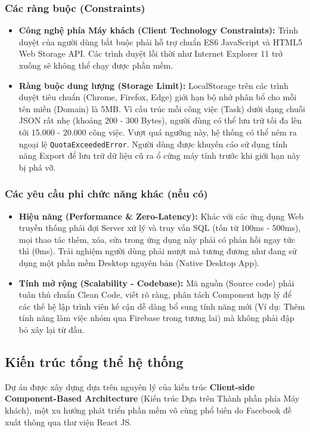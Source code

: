 \subsubsection{Các ràng buộc (Constraints)}
\begin{itemize}
    \item \textbf{Công nghệ phía Máy khách (Client Technology Constraints):} Trình duyệt của người dùng bắt buộc phải hỗ trợ chuẩn ES6 JavaScript và HTML5 Web Storage API. Các trình duyệt lỗi thời như Internet Explorer 11 trở xuống sẽ không thể chạy được phần mềm.
    \item \textbf{Ràng buộc dung lượng (Storage Limit):} LocalStorage trên các trình duyệt tiêu chuẩn (Chrome, Firefox, Edge) giới hạn bộ nhớ phân bổ cho mỗi tên miền (Domain) là 5MB. Vì cấu trúc mỗi công việc (Task) dưới dạng chuỗi JSON rất nhẹ (khoảng 200 - 300 Bytes), người dùng có thể lưu trữ tối đa lên tới 15.000 - 20.000 công việc. Vượt quá ngưỡng này, hệ thống có thể ném ra ngoại lệ \texttt{QuotaExceededError}. Người dùng được khuyến cáo sử dụng tính năng Export để lưu trữ dữ liệu cũ ra ổ cứng máy tính trước khi giới hạn này bị phá vỡ.
\end{itemize}

\subsubsection{Các yêu cầu phi chức năng khác (nếu có)}
\begin{itemize}
    \item \textbf{Hiệu năng (Performance \& Zero-Latency):} Khác với các ứng dụng Web truyền thống phải đợi Server xử lý và truy vấn SQL (tốn từ 100ms - 500ms), mọi thao tác thêm, xóa, sửa trong ứng dụng này phải có phản hồi ngay tức thì (0ms). Trải nghiệm người dùng phải mượt mà tương đương như đang sử dụng một phần mềm Desktop nguyên bản (Native Desktop App).
    \item \textbf{Tính mở rộng (Scalability - Codebase):} Mã nguồn (Source code) phải tuân thủ chuẩn Clean Code, viết rõ ràng, phân tách Component hợp lý để các thế hệ lập trình viên kế cận dễ dàng bổ sung tính năng mới (Ví dụ: Thêm tính năng làm việc nhóm qua Firebase trong tương lai) mà không phải đập bỏ xây lại từ đầu.
\end{itemize}

\subsection{Kiến trúc tổng thể hệ thống}
Dự án được xây dựng dựa trên nguyên lý của kiến trúc \textbf{Client-side Component-Based Architecture} (Kiến trúc Dựa trên Thành phần phía Máy khách), một xu hướng phát triển phần mềm vô cùng phổ biến do Facebook đề xuất thông qua thư viện React JS. 

